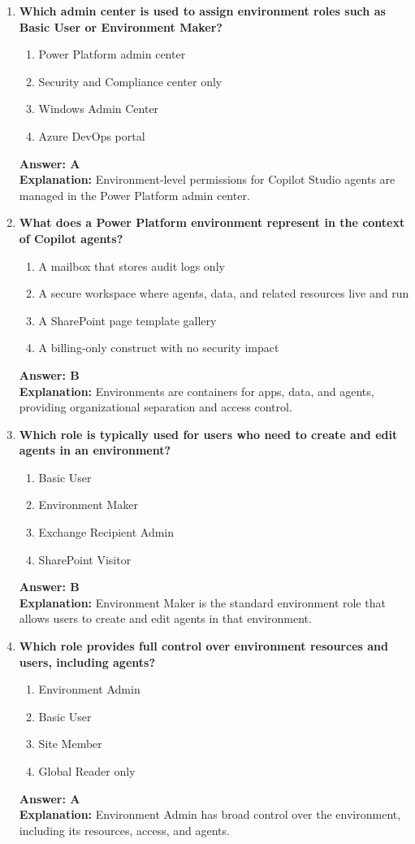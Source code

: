 \documentclass[10pt]{article}
\begin{document}
\begin{enumerate}[leftmargin=*]
\item \textbf{Which admin center is used to assign environment roles such as Basic User or Environment Maker?}
\begin{enumerate}[label=\Alph*.]
  \item Power Platform admin center
  \item Security and Compliance center only
  \item Windows Admin Center
  \item Azure DevOps portal
\end{enumerate}
\textbf{Answer: A}\\
\textbf{Explanation:} Environment-level permissions for Copilot Studio agents are managed in the Power Platform admin center.

\item \textbf{What does a Power Platform environment represent in the context of Copilot agents?}
\begin{enumerate}[label=\Alph*.]
  \item A mailbox that stores audit logs only
  \item A secure workspace where agents, data, and related resources live and run
  \item A SharePoint page template gallery
  \item A billing-only construct with no security impact
\end{enumerate}
\textbf{Answer: B}\\
\textbf{Explanation:} Environments are containers for apps, data, and agents, providing organizational separation and access control.

\item \textbf{Which role is typically used for users who need to create and edit agents in an environment?}
\begin{enumerate}[label=\Alph*.]
  \item Basic User
  \item Environment Maker
  \item Exchange Recipient Admin
  \item SharePoint Visitor
\end{enumerate}
\textbf{Answer: B}\\
\textbf{Explanation:} Environment Maker is the standard environment role that allows users to create and edit agents in that environment.

\item \textbf{Which role provides full control over environment resources and users, including agents?}
\begin{enumerate}[label=\Alph*.]
  \item Environment Admin
  \item Basic User
  \item Site Member
  \item Global Reader only
\end{enumerate}
\textbf{Answer: A}\\
\textbf{Explanation:} Environment Admin has broad control over the environment, including its resources, access, and agents.


\end{enumerate}
\end{document}
